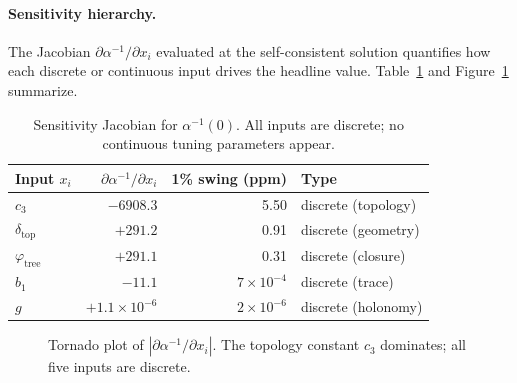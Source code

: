 \paragraph{Sensitivity hierarchy.}
The Jacobian $\partial\alpha^{-1}/\partial x_i$ evaluated at the self-consistent
solution quantifies how each discrete or continuous input drives the headline value.
Table~\ref{tab:jacobian} and Figure~\ref{fig:tornado} summarize.

\begin{table}[H]
\centering\small
\begin{tabular}{@{}lrrp{3cm}@{}}
\toprule
Input $x_i$ & $\partial\alpha^{-1}/\partial x_i$ & 1\% swing (ppm) & Type\\
\midrule
$c_3$           & $-6908.3$ & 5.50  & discrete (topology)\\
$\delta_{\mathrm{top}}$ & $+291.2$  & 0.91  & discrete (geometry)\\
$\varphi_{\mathrm{tree}}$ & $+291.1$  & 0.31  & discrete (closure)\\
$b_1$           & $-11.1$   & $7\times10^{-4}$ & discrete (trace)\\
$g$             & $+1.1\times10^{-6}$ & $2\times10^{-6}$ & discrete (holonomy)\\
\bottomrule
\end{tabular}
\caption{Sensitivity Jacobian for $\alpha^{-1}(0)$.
  All inputs are discrete; no continuous tuning parameters appear.}
\label{tab:jacobian}
\end{table}

\begin{figure}[H]
\centering
{}
\caption{Tornado plot of $|\partial\alpha^{-1}/\partial x_i|$.
  The topology constant $c_3$ dominates; all five inputs are discrete.}
\label{fig:tornado}
\end{figure}

